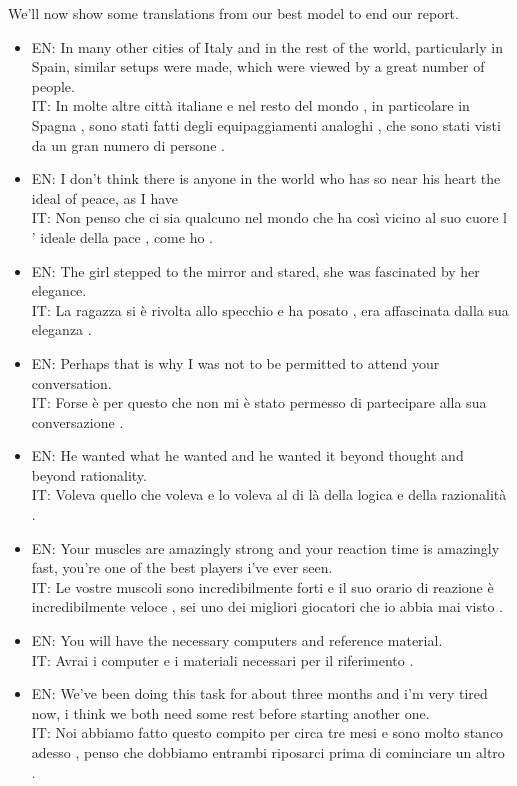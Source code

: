 We'll now show some translations from our best model to end our report.
\begin{itemize}
    \item EN: In many other cities of Italy and in the rest of the world, particularly in Spain, similar setups were made, which were viewed by a great number of people.\\IT: In molte altre città italiane e nel resto del mondo , in particolare in Spagna , sono stati fatti degli equipaggiamenti analoghi , che sono stati visti da un gran numero di persone .

    \item EN: I don't think there is anyone in the world who has so near his heart the ideal of peace, as I have\\IT: Non penso che ci sia qualcuno nel mondo che ha così vicino al suo cuore l ' ideale della pace , come ho .

    \item EN: The girl stepped to the mirror and stared, she was fascinated by her elegance.\\IT: La ragazza si è rivolta allo specchio e ha posato , era affascinata dalla sua eleganza .

    \item EN: Perhaps that is why I was not to be permitted to attend your conversation.\\IT: Forse è per questo che non mi è stato permesso di partecipare alla sua conversazione .

    \item EN: He wanted what he wanted and he wanted it beyond thought and beyond rationality.\\IT: Voleva quello che voleva e lo voleva al di là della logica e della razionalità .

    \item EN: Your muscles are amazingly strong and your reaction time is amazingly fast, you're one of the best players i've ever seen.\\IT: Le vostre muscoli sono incredibilmente forti e il suo orario di reazione è incredibilmente veloce , sei uno dei migliori giocatori che io abbia mai visto .

    \item EN: You will have the necessary computers and reference material.\\IT: Avrai i computer e i materiali necessari per il riferimento .

    \item EN: We've been doing this task for about three months and i'm very tired now, i think we both need some rest before starting another one.\\IT: Noi abbiamo fatto questo compito per circa tre mesi e sono molto stanco adesso , penso che dobbiamo entrambi riposarci prima di cominciare un altro .


\end{itemize}
